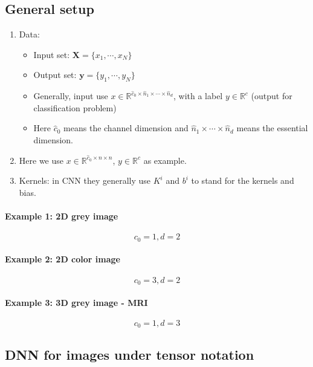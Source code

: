 \subsection{General setup}
\begin{enumerate}
\item Data:
	\begin{itemize}
	\item Input set: $\bm{X} = \{x_1, \cdots, x_N\}$
	\item Output set: $\bm{y} =  \{y_1, \cdots, y_N\}$
	\item Generally,  input use $x \in \mathbb{R}^{\hat c_0 \times \hat n_1\times \cdots \times \hat n_d }$, with a label $y \in \mathbb{R}^c$ (output for classification problem)
	\item Here $\hat c_0$ means the channel dimension and $\hat n_1\times \cdots \times \hat n_d$ means the essential dimension.
	\end{itemize}
      \item Here we use $x \in \mathbb{R}^{\hat c_0 \times n \times n} $,
        $y \in \mathbb{R}^c$ as example.
\item Kernels: in CNN they generally use $K^i$ and $b^i$ to stand for the kernels and bias.
\end{enumerate}

\paragraph{Example 1: 2D grey image}
\begin{equation}\label{2DGreyImage}
c_0=1, d=2
\end{equation}
\paragraph{Example 2: 2D color image}
\begin{equation}\label{2DColorImage}
c_0=3, d=2
\end{equation}
\paragraph{Example 3: 3D grey image - MRI}
\begin{equation}\label{2DColorImage}
c_0=1, d=3
\end{equation}


\subsection{DNN for images under tensor notation}

